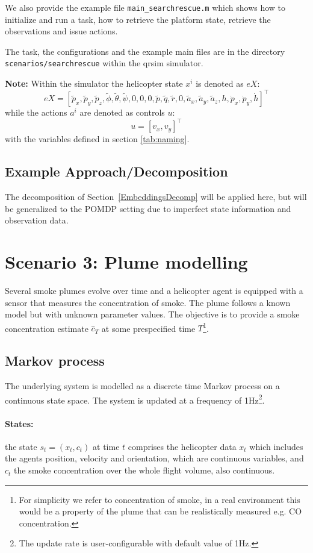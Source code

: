 \documentclass{article}
\newcommand\mytexttt[1]{\texttt{\hyphenchar\font=45\relax #1}}
\begin{document}
We also provide the example file \texttt{main\_searchrescue.m} which shows how to initialize and run a task, how to retrieve the platform state, retrieve the observations and issue actions.

The task, the configurations and the example main files are in the directory \mytexttt{scenarios/searchrescue} within the qrsim simulator. 

\textbf{Note:}
Within the simulator the helicopter state $x^i$ is denoted as $eX$:
$$eX = [\tilde{p}_x,\tilde{p}_y,\tilde{p}_z,\tilde{\phi},\tilde{\theta},\tilde{\psi},0,0,0,\tilde{p},\tilde{q},\tilde{r},0,\tilde{a}_x,\tilde{a}_y,\tilde{a}_z,h,\dot{p}_x,\dot{p}_y,\dot{h}]^\intercal$$
while the actions $a^i$ are denoted as controls $u$:
$$u=[v_x,v_y]^\intercal$$
with the variables defined in section \ref{tab:naming}.

\subsection{Example Approach/Decomposition}

The decomposition of Section~\ref{EmbeddingsDecomp} will be applied here, but will be generalized to the POMDP setting due to imperfect state information and observation data.


\newpage
\section{Scenario 3: Plume modelling}
Several smoke plumes evolve over time and a helicopter agent is equipped with a sensor that measures the concentration of smoke. The plume follows a known model but with unknown parameter values. The objective is to provide a smoke concentration estimate $\hat{c}_T$ at some prespecified time $T$\footnote{For simplicity we refer to concentration of smoke, in a real environment this would be a property of the plume that can be realistically measured e.g. CO concentration.}.

\subsection{Markov process}
The underlying system is modelled as a discrete time Markov process on a continuous state space. The system is updated at a frequency of 1Hz\footnote{The update rate is user-configurable with default value of 1Hz.}. 

\paragraph{States:} the state $s_t=(x_t,c_t)$ at time $t$ comprises the helicopter data $x_t$ which includes the agents position, velocity and orientation, which are continuous variables, and $c_t$ the smoke concentration over the whole flight volume, also continuous.
\end{document}
